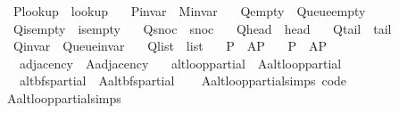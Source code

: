 \begin{isabellebody}
\ \ P{\isacharunderscore}{\kern0pt}lookup\ {\isacharequal}{\kern0pt}\ lookup\ \isanewline
\ \ P{\isacharunderscore}{\kern0pt}invar\ {\isacharequal}{\kern0pt}\ M{\isachardot}{\kern0pt}invar\ \isanewline
\ \ Q{\isacharunderscore}{\kern0pt}empty\ {\isacharequal}{\kern0pt}\ Queue{\isachardot}{\kern0pt}empty\ \isanewline
\ \ Q{\isacharunderscore}{\kern0pt}is{\isacharunderscore}{\kern0pt}empty\ {\isacharequal}{\kern0pt}\ is{\isacharunderscore}{\kern0pt}empty\ \isanewline
\ \ Q{\isacharunderscore}{\kern0pt}snoc\ {\isacharequal}{\kern0pt}\ snoc\ \isanewline
\ \ Q{\isacharunderscore}{\kern0pt}head\ {\isacharequal}{\kern0pt}\ head\ \isanewline
\ \ Q{\isacharunderscore}{\kern0pt}tail\ {\isacharequal}{\kern0pt}\ tail\ \isanewline
\ \ Q{\isacharunderscore}{\kern0pt}invar\ {\isacharequal}{\kern0pt}\ Queue{\isachardot}{\kern0pt}invar\ \isanewline
\ \ Q{\isacharunderscore}{\kern0pt}list\ {\isacharequal}{\kern0pt}\ list\isanewline
\ \ \ P\ {\isacharequal}{\kern0pt}\ A{\isachardot}{\kern0pt}P\isanewline
\ \ \ P{\isacharprime}{\kern0pt}\ {\isacharequal}{\kern0pt}\ A{\isachardot}{\kern0pt}P{\isacharprime}{\kern0pt}\isanewline
\ \ \ adjacency\ {\isacharequal}{\kern0pt}\ A{\isachardot}{\kern0pt}adjacency\isanewline
\ \ \ alt{\isacharunderscore}{\kern0pt}loop{\isacharunderscore}{\kern0pt}partial\ {\isacharequal}{\kern0pt}\ A{\isachardot}{\kern0pt}alt{\isacharunderscore}{\kern0pt}loop{\isacharunderscore}{\kern0pt}partial\isanewline
\ \ \ alt{\isacharunderscore}{\kern0pt}bfs{\isacharunderscore}{\kern0pt}partial\ {\isacharequal}{\kern0pt}\ A{\isachardot}{\kern0pt}alt{\isacharunderscore}{\kern0pt}bfs{\isacharunderscore}{\kern0pt}partial\isanewline
%
\isadelimproof
\ \ %
\endisadelimproof
%
\isatagproof
\isacommand{{\isachardot}{\kern0pt}{\isachardot}{\kern0pt}}\isamarkupfalse%
%
\endisatagproof
{\isafoldproof}%
%
\isadelimproof
\isanewline
%
\endisadelimproof
\isanewline
{}\isamarkupfalse%
\ A{\isachardot}{\kern0pt}alt{\isacharunderscore}{\kern0pt}loop{\isacharunderscore}{\kern0pt}partial{\isachardot}{\kern0pt}simps\ {\isacharbrackleft}{\kern0pt}code{\isacharbrackright}{\kern0pt}\isanewline
{}\isamarkupfalse%
\ A{\isachardot}{\kern0pt}alt{\isacharunderscore}{\kern0pt}loop{\isacharunderscore}{\kern0pt}partial{\isachardot}{\kern0pt}simps\isanewline
{}\isamarkupfalse%

\end{isabellebody}
